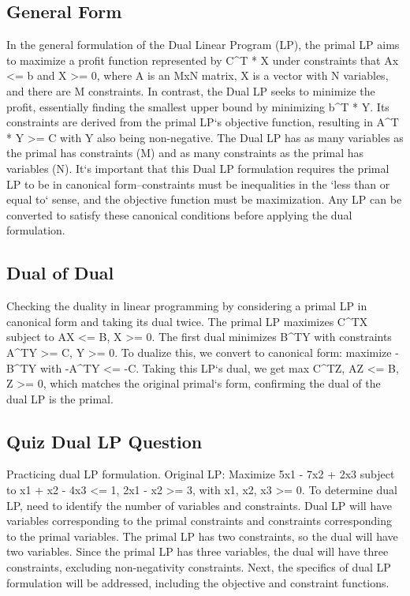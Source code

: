 \subsection*{General Form}
In the general formulation of the Dual Linear Program (LP), the primal LP aims to maximize a profit function represented by C\textasciicircum{}T * X under constraints that Ax \textless{}= b and X \textgreater{}= 0, where A is an MxN matrix, X is a vector with N variables, and there are M constraints.
In contrast, the Dual LP seeks to minimize the profit, essentially finding the smallest upper bound by minimizing b\textasciicircum{}T * Y\@.
Its constraints are derived from the primal LP`s objective function, resulting in A\textasciicircum{}T * Y \textgreater{}= C with Y also being non-negative.
The Dual LP has as many variables as the primal has constraints (M) and as many constraints as the primal has variables (N).
It`s important that this Dual LP formulation requires the primal LP to be in canonical form--constraints must be inequalities in the `less than or equal to` sense, and the objective function must be maximization.
Any LP can be converted to satisfy these canonical conditions before applying the dual formulation.

\subsection*{Dual of Dual}
Checking the duality in linear programming by considering a primal LP in canonical form and taking its dual twice.
The primal LP maximizes C\textasciicircum{}TX subject to AX \textless{}= B, X \textgreater{}= 0.
The first dual minimizes B\textasciicircum{}TY with constraints A\textasciicircum{}TY \textgreater{}= C, Y \textgreater{}= 0.
To dualize this, we convert to canonical form: maximize -B\textasciicircum{}TY with -A\textasciicircum{}TY \textless{}= -C\@.
Taking this LP`s dual, we get max C\textasciicircum{}TZ, AZ \textless{}= B, Z \textgreater{}= 0, which matches the original primal`s form, confirming the dual of the dual LP is the primal.

\subsection*{Quiz  Dual LP Question}
Practicing dual LP formulation.
Original LP: Maximize 5x1 - 7x2 + 2x3 subject to x1 + x2 - 4x3 \textless{}= 1, 2x1 - x2 \textgreater{}= 3, with x1, x2, x3 \textgreater{}= 0.
To determine dual LP, need to identify the number of variables and constraints.
Dual LP will have variables corresponding to the primal constraints and constraints corresponding to the primal variables.
The primal LP has two constraints, so the dual will have two variables.
Since the primal LP has three variables, the dual will have three constraints, excluding non-negativity constraints.
Next, the specifics of dual LP formulation will be addressed, including the objective and constraint functions.

